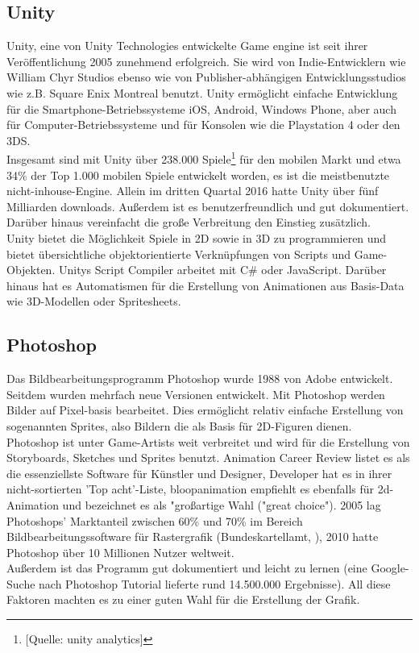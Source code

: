 \documentclass[extern,palatino]{cgBA}
\begin{document}
\subsection{Unity}
Unity, eine von Unity Technologies entwickelte Game engine ist seit ihrer Veröffentlichung 2005 zunehmend erfolgreich. %
Sie wird von Indie-Entwicklern wie William Chyr Studios ebenso wie von Publisher-abhängigen Entwicklungsstudios wie z.B. Square Enix Montreal benutzt. Unity ermöglicht einfache Entwicklung für die Smartphone-Betriebssysteme iOS, Android, Windows Phone, aber auch für Computer-Betriebssysteme und für Konsolen wie die Playstation 4 oder den 3DS.
\\Insgesamt sind mit Unity über 238.000 Spiele\footnote{[Quelle: unity analytics]} für den mobilen Markt %
und etwa 34\% der Top 1.000 mobilen Spiele entwickelt worden, es ist die meistbenutzte nicht-inhouse-Engine. Allein im dritten Quartal 2016 hatte Unity über fünf Milliarden downloads. Außerdem ist es benutzerfreundlich und gut dokumentiert. Darüber hinaus vereinfacht die große Verbreitung den Einstieg zusätzlich.
\\Unity bietet die Möglichkeit Spiele in 2D sowie in 3D zu programmieren und bietet übersichtliche objektorientierte Verknüpfungen von Scripts und Game-Objekten. Unitys Script Compiler arbeitet mit C\# oder JavaScript. Darüber hinaus hat es Automatismen für die Erstellung von Animationen aus Basis-Data wie 3D-Modellen oder Spritesheets. 
\newpage 
\subsection{Photoshop}
Das Bildbearbeitungsprogramm Photoshop wurde 1988 von Adobe entwickelt. Seitdem wurden mehrfach neue Versionen entwickelt. Mit Photoshop werden Bilder auf Pixel-basis bearbeitet. Dies ermöglicht relativ einfache Erstellung von sogenannten Sprites, also Bildern die als Basis für 2D-Figuren dienen.
\\
Photoshop ist unter Game-Artists weit verbreitet und wird für die Erstellung von Storyboards, Sketches und Sprites benutzt. Animation Career Review listet es als%
die essenziellste Software für Künstler und Designer, Developer hat es in ihrer nicht-sortierten 'Top acht'-Liste, bloopanimation empfiehlt es ebenfalls für %
2d-Animation und bezeichnet es als "großartige Wahl ("great choice"). 2005 lag Photoshops' Marktanteil zwischen 60\% und 70\% im Bereich Bildbearbeitungssoftware für Rastergrafik (Bundeskartellamt, %
), 2010 hatte Photoshop über 10 Millionen Nutzer weltweit.
\\
Außerdem ist das Programm gut dokumentiert und leicht zu lernen (eine Google-Suche nach Photoshop Tutorial lieferte rund 14.500.000 Ergebnisse). All diese Faktoren machten es zu einer guten Wahl für die Erstellung der Grafik.%
\newpage
\end{document}
